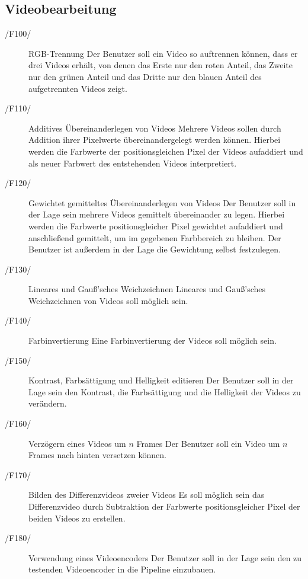 \subsection{Videobearbeitung}
\begin{description}
        \item[/F100/]RGB-Trennung \newline
                 Der Benutzer soll ein Video so auftrennen können, dass er drei Videos erhält, von denen das Erste nur den roten Anteil, das Zweite nur den grünen Anteil und das Dritte nur den blauen Anteil des aufgetrennten Videos zeigt.
        \item[/F110/]Additives Übereinanderlegen von Videos \newline
                Mehrere Videos sollen durch Addition ihrer Pixelwerte übereinandergelegt werden können. Hierbei werden die Farbwerte der positionsgleichen Pixel der Videos aufaddiert und als neuer Farbwert des entstehenden Videos interpretiert.
        \item[/F120/]Gewichtet gemitteltes Übereinanderlegen von  Videos \newline
                Der Benutzer soll in der Lage sein mehrere Videos gemittelt übereinander zu legen. Hierbei werden die Farbwerte positionsgleicher Pixel gewichtet aufaddiert und anschließend gemittelt, um im gegebenen Farbbereich zu bleiben. Der Benutzer ist außerdem in der Lage die Gewichtung selbst festzulegen.
        \item[/F130/]Lineares und Gauß'sches Weichzeichnen \newline
                Lineares und Gauß'sches Weichzeichnen von Videos soll möglich sein.
        \item[/F140/]Farbinvertierung \newline
                Eine Farbinvertierung der Videos soll möglich sein.
        \item[/F150/]Kontrast, Farbsättigung und Helligkeit editieren \newline
                Der Benutzer soll in der Lage sein den Kontrast, die Farbsättigung und die Helligkeit der Videos zu verändern.
        \item[/F160/]Verzögern eines Videos um $n$ Frames \newline
                Der Benutzer soll ein Video um $n$ Frames nach hinten versetzen können.       
        \item[/F170/]Bilden des Differenzvideos zweier Videos \newline
                Es soll möglich sein das Differenzvideo durch Subtraktion der Farbwerte positionsgleicher Pixel der beiden Videos zu erstellen.
	\item[/F180/]Verwendung eines Videoencoders \newline
		Der Benutzer soll in der Lage sein den zu testenden Videoencoder in die Pipeline einzubauen.
\end{description}
 
